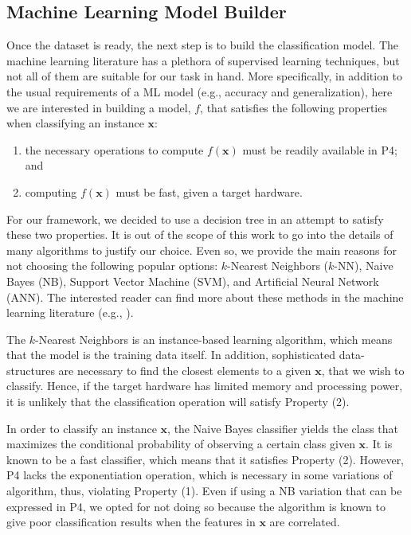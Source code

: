 \subsection{Machine Learning Model Builder}\label{sub:builder}

Once the dataset is ready, the next step is to build the classification model. The machine learning literature has a plethora of supervised learning techniques, but not all of them are suitable for our task in hand. More specifically, in addition to the usual requirements of a ML model (e.g., accuracy and generalization), here we are interested in building a model, $f$, that satisfies the following properties when classifying an instance $\mathbf{x}$:
\begin{enumerate}
    \item the necessary operations to compute $f(\mathbf{x})$ must be readily available in P4; and
    \item computing $f(\mathbf{x})$ must be fast, given a target hardware.
\end{enumerate}

For our framework, we decided to use a decision tree in an attempt to satisfy these two properties. It is out of the scope of this work to go into the details of many algorithms to justify our choice. Even so, we provide the main reasons for not choosing the following popular options: $k$-Nearest Neighbors ($k$-NN), Naive Bayes (NB), Support Vector Machine (SVM), and Artificial Neural Network (ANN).
The interested reader can find more about these methods in the machine learning literature (e.g., \cite{mitchell97,bishop2006,hastie2001,Goodfellow-et-al-2016}).

The $k$-Nearest Neighbors is an instance-based learning algorithm, which means that the model is the training data itself. In addition, sophisticated data-structures are necessary to find the closest elements to a given $\mathbf{x}$, that we wish to classify. Hence, 
if the target hardware has limited memory and processing power, 
it is unlikely that the classification operation will satisfy Property (2).

In order to classify an instance $\mathbf{x}$, the Naive Bayes classifier yields the class that maximizes the conditional probability of observing a certain class given $\mathbf{x}$. It is known to be a fast classifier, which means that it satisfies Property (2). However, P4 lacks the exponentiation operation, which is necessary in some variations of algorithm, thus, violating Property (1). Even if using a NB variation that can be expressed in P4, we opted for not doing so because the algorithm is known to give poor classification results when the features in $\mathbf{x}$ are correlated.


